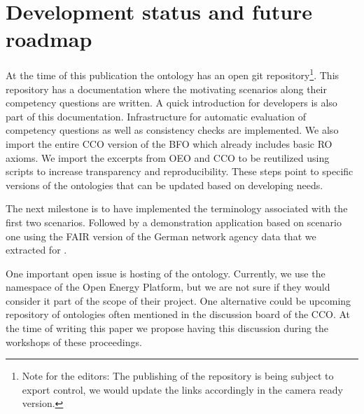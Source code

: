\section{Development status and future roadmap}
\label{achievment}

At the time of this publication the ontology has an open git
repository\footnote{Note for the editors: The publishing of the repository is
being subject to export control, we would update the links accordingly in the
camera ready version. }. This repository has a documentation where the
motivating scenarios along their competency questions are written. A quick
introduction for developers is also part of this documentation. Infrastructure
for automatic evaluation of competency questions as well as consistency checks
are implemented. We also import the entire CCO version of the BFO which already
includes basic RO axioms. We import  the excerpts from OEO and CCO to be
reutilized using scripts to increase transparency and reproducibility. These
steps point to specific versions of the ontologies that can be updated based on
developing needs. 

The next milestone is to have implemented the terminology associated with the
first two scenarios. Followed by a demonstration application based on scenario
one using the FAIR version of the German network agency data that we extracted
for \cite{ArellanoRuiz.2024}.

One important open issue is hosting of the ontology. Currently, we use the
namespace of the Open Energy Platform, but we are not sure if they would
consider it part of the scope of their project. One alternative could be
upcoming repository of ontologies often mentioned in the discussion board of
the CCO. At the time of writing this paper we propose having this discussion
during the workshops of these proceedings.